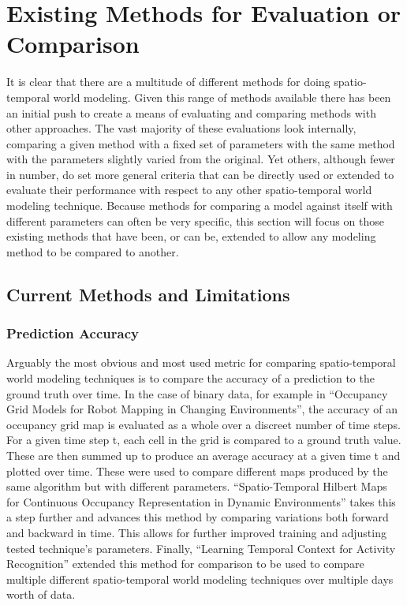   \section{ Existing Methods for Evaluation or Comparison }

  It is clear that there are a multitude of different methods for doing
  spatio-temporal world modeling. Given this range of methods available
  there has been an initial push to create a means of evaluating and comparing methods
  with other approaches. The vast majority of these evaluations look internally,
  comparing a given method with a fixed set of parameters with the same method with
  the parameters slightly varied from the original. Yet others, although fewer
  in number, do set more general criteria that can be directly used or extended
  to evaluate their performance with respect to any other spatio-temporal
  world modeling technique. Because methods for comparing a model against itself
  with different parameters can often be very specific, this section will focus
  on those existing methods that have been, or can be, extended to allow any
  modeling method to be compared to another. \\

  \subsection{ Current Methods and Limitations}

  \subsubsection { Prediction Accuracy }
  Arguably the most obvious and most used metric for comparing spatio-temporal
  world modeling techniques is to compare the accuracy of a prediction
  to the ground truth over time. In the case of binary data, for example in
  ``Occupancy Grid Models for Robot Mapping in Changing Environments'',
  \cite{Meyer-Delius2012} the accuracy of an occupancy grid map is evaluated as
  a whole over a discreet number of time steps. For a given time step t,
  each cell in the grid is compared to a ground truth value. These are then
  summed up to produce an average accuracy at a given time t and plotted over
  time. These were used to compare different maps produced by the same algorithm
  but with different parameters. ``Spatio-Temporal Hilbert Maps for Continuous
  Occupancy Representation in Dynamic Environments'' \cite{Senanayake2016}
  takes this a step further and advances this method by comparing variations
  both forward and backward in time. This allows for further
  improved training and adjusting tested technique's parameters. Finally,
  ``Learning Temporal Context for Activity Recognition'' \cite{Coppola2016}
  extended this method for comparison to be used to compare multiple different
  spatio-temporal world modeling techniques over multiple days worth of data. \\

